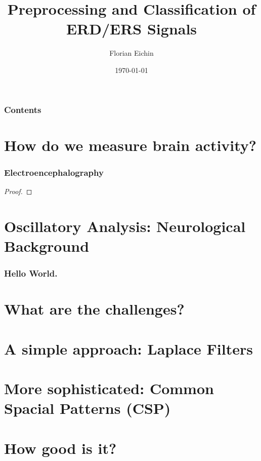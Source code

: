 \documentclass{beamer}
\title{Preprocessing and Classification of ERD/ERS Signals}
\author{Florian Eichin}
\institute{Freiburg University}
\date{\today}
\begin{document}
\maketitle

\begin{frame}
	\frametitle{Contents}
	\tableofcontents
\end{frame}

\section{How do we measure brain activity?}

\begin{frame}
\frametitle{Electroencephalography} 
\begin{definition}

\end{definition}
\begin{proof}
\end{proof}
\end{frame}

\section{Oscillatory Analysis: Neurological Background}
\begin{frame}
	\frametitle{Hello World.}
	
\end{frame}

\section{What are the challenges?}


\section{A simple approach: Laplace Filters}


\section{More sophisticated: Common Spacial Patterns (CSP)}


\section{How good is it?}
\end{document}
